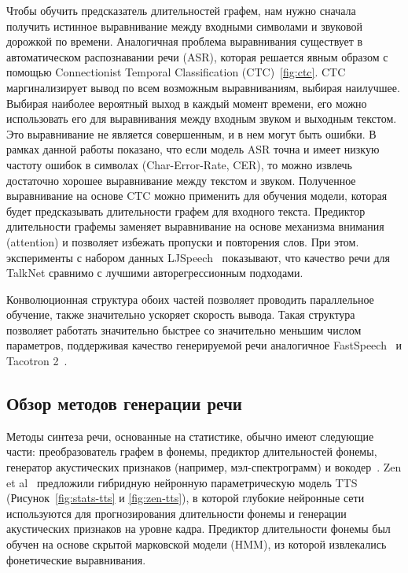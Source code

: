 Чтобы обучить предсказатель длительностей графем, нам нужно сначала получить истинное выравнивание между входными символами и звуковой дорожкой по времени. Аналогичная проблема выравнивания существует в автоматическом распознавании речи (ASR), которая решается явным образом с помощью Connectionist Temporal Classification (CTC)~\ref{fig:ctc}. CTC маргинализирует вывод по всем возможным выравниваниям, выбирая наилучшее. Выбирая наиболее вероятный выход в каждый момент времени, его можно использовать его для выравнивания между входным звуком и выходным текстом. Это выравнивание не является совершенным, и в нем могут быть ошибки. В рамках данной работы показано, что если модель ASR точна и имеет низкую частоту ошибок в символах (Char-Error-Rate, CER), то можно извлечь достаточно хорошее выравнивание между текстом и звуком. Полученное выравнивание на основе CTC можно применить для обучения модели, которая будет предсказывать длительности графем для входного текста. Предиктор длительности графемы заменяет выравнивание на основе механизма внимания (attention) и позволяет избежать пропуски и повторения слов. При этом. эксперименты с набором данных LJSpeech~\cite{ljspeech} показывают, что качество речи для TalkNet сравнимо с лучшими авторегрессионным подходами.

Конволюционная структура обоих частей позволяет проводить параллельное обучение, также значительно ускоряет скорость вывода. Такая структура позволяет работать значительно быстрее со значительно меньшим числом параметров, поддерживая качество генерируемой речи аналогичное FastSpeech~\cite{fastspeech} и Tacotron 2~\cite{tacotron2}.

\subsection{Обзор методов генерации речи}

Методы синтеза речи, основанные на статистике, обычно имеют следующие части: преобразователь графем в фонемы, предиктор длительностей фонемы, генератор акустических признаков (например, мэл-спектрограмм) и вокодер~\cite{taylor}. Zen et al~\cite{zen2009,zen-2015,zen-2016} предложили гибридную нейронную параметрическую модель TTS (Рисунок~\ref{fig:stats-tts} и \ref{fig:zen-tts}), в которой глубокие нейронные сети используются для прогнозирования длительности фонемы и генерации акустических признаков на уровне кадра. Предиктор длительности фонемы был обучен на основе скрытой марковской модели (HMM), из которой извлекались фонетические выравнивания.

